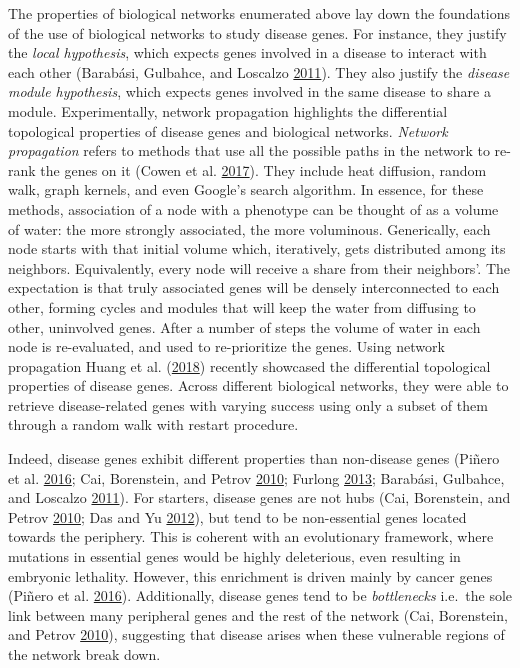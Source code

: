 \documentclass[
  11pt,
]{env/yjiao}
\begin{document}
The properties of biological networks enumerated above lay down the foundations of the use of biological networks to study disease genes. For instance, they justify the \emph{local hypothesis}, which expects genes involved in a disease to interact with each other (Barabási, Gulbahce, and Loscalzo \protect\hyperlink{ref-barabasi_network_2011}{2011}). They also justify the \emph{disease module hypothesis}, which expects genes involved in the same disease to share a module. Experimentally, network propagation highlights the differential topological properties of disease genes and biological networks. \emph{Network propagation} refers to methods that use all the possible paths in the network to re-rank the genes on it (Cowen et al. \protect\hyperlink{ref-cowen_network_2017}{2017}). They include heat diffusion, random walk, graph kernels, and even Google's search algorithm. In essence, for these methods, association of a node with a phenotype can be thought of as a volume of water: the more strongly associated, the more voluminous. Generically, each node starts with that initial volume which, iteratively, gets distributed among its neighbors. Equivalently, every node will receive a share from their neighbors'. The expectation is that truly associated genes will be densely interconnected to each other, forming cycles and modules that will keep the water from diffusing to other, uninvolved genes. After a number of steps the volume of water in each node is re-evaluated, and used to re-prioritize the genes. Using network propagation Huang et al. (\protect\hyperlink{ref-huang_systematic_2018}{2018}) recently showcased the differential topological properties of disease genes. Across different biological networks, they were able to retrieve disease-related genes with varying success using only a subset of them through a random walk with restart procedure.

Indeed, disease genes exhibit different properties than non-disease genes (Piñero et al. \protect\hyperlink{ref-pinero_uncovering_2016}{2016}; Cai, Borenstein, and Petrov \protect\hyperlink{ref-cai_broker_2010}{2010}; Furlong \protect\hyperlink{ref-furlong_human_2013}{2013}; Barabási, Gulbahce, and Loscalzo \protect\hyperlink{ref-barabasi_network_2011}{2011}). For starters, disease genes are not hubs (Cai, Borenstein, and Petrov \protect\hyperlink{ref-cai_broker_2010}{2010}; Das and Yu \protect\hyperlink{ref-das_hint_2012}{2012}), but tend to be non-essential genes located towards the periphery. This is coherent with an evolutionary framework, where mutations in essential genes would be highly deleterious, even resulting in embryonic lethality. However, this enrichment is driven mainly by cancer genes (Piñero et al. \protect\hyperlink{ref-pinero_uncovering_2016}{2016}). Additionally, disease genes tend to be \emph{bottlenecks} i.e.~the sole link between many peripheral genes and the rest of the network (Cai, Borenstein, and Petrov \protect\hyperlink{ref-cai_broker_2010}{2010}), suggesting that disease arises when these vulnerable regions of the network break down.
\end{document}
